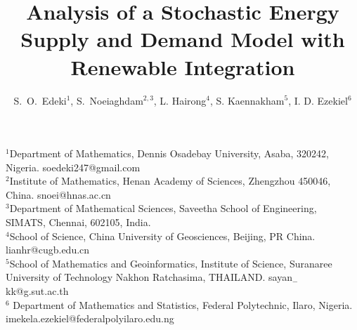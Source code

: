 \documentclass[11pt]{article}
\numberwithin{equation}{section}
\begin{document}
\title{\textbf{Analysis of a Stochastic Energy Supply and Demand Model with Renewable Integration}}

\author{S.~O.~Edeki$^1$, S.~Noeiaghdam$^{2,3}$, L. Hairong$^4$, S. Kaennakham$^5$, I. D. Ezekiel$^{6}$ }
  \date{}
 \maketitle
 
\begin{center}
\scriptsize{ $^1$Department of Mathematics, Dennis Osadebay University, Asaba, 320242, Nigeria. soedeki247@gmail.com\\
 $^2$Institute of Mathematics, Henan Academy of Sciences, Zhengzhou 450046, China. snoei@hnas.ac.cn\\
 $^3$Department of Mathematical Sciences, Saveetha School of Engineering, SIMATS, Chennai, 602105, India.\\
 $^4$School of Science, China University of Geosciences, Beijing, PR China. lianhr@cugb.edu.cn \\
 $^5$School of Mathematics and Geoinformatics, Institute of Science, Suranaree University of Technology
Nakhon Ratchasima, THAILAND. sayan$_{-}$kk@g.sut.ac.th  \\
$^6$ Department of Mathematics and Statistics, Federal Polytechnic, Ilaro, Nigeria. imekela.ezekiel@federalpolyilaro.edu.ng  \\

}
\end{center}

\end{document}
